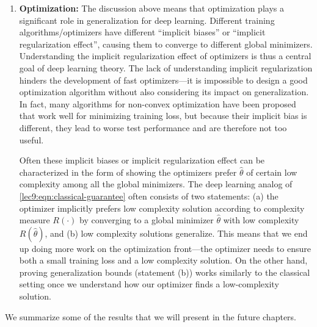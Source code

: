 \begin{enumerate}
\item {\bf Optimization:} The discussion above means that optimization plays a significant role in generalization for deep learning. Different training algorithms/optimizers have different ``implicit biases'' or ``implicit regularization effect'', causing them to converge to different global minimizers. Understanding the implicit regularization effect of optimizers is thus a central goal of deep learning theory. The lack of understanding implicit regularization hinders the development of fast optimizers---it is impossible to design a good optimization algorithm without also considering its impact on generalization. In fact, many algorithms for non-convex optimization have been proposed that work well for minimizing training loss, but because their implicit bias is different, they lead to worse test performance and are therefore not too useful.
    
Often these implicit biases or implicit regularization effect can be characterized in the form of showing the optimizers prefer $\hat\theta$ of certain low complexity among all the global minimizers. The deep learning analog of \eqref{lec9:eqn:classical-guarantee} often consists of two statements: (a) the optimizer implicitly prefers low complexity solution according to complexity measure $R(\cdot)$ by converging to a global minimizer $\hat{\theta}$ with low complexity $R(\hat{\theta})$, and (b) low complexity solutions generalize. This means that we end up doing more work on the optimization front---the optimizer needs to ensure both a small training loss and a low complexity solution. On the other hand, proving generalization bounds (statement (b)) works similarly to the classical setting once we understand how our optimizer finds a low-complexity solution.
    
\end{enumerate}

We summarize some of the results that we will present in the future chapters. 

